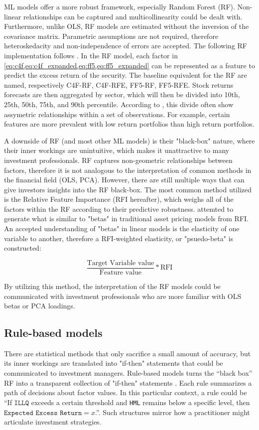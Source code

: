 ML models offer a more robust framework, especially Random Forest (RF). Non-linear relationships can be captured and multicollinearity could be dealt with. Furthermore, unlike OLS, RF models are estimated without the inversion of the covariance matrix. Parametric assumptions are not required, therefore heteroskedacity and non-independence of errors are accepted. The following RF implementation follows . In the RF model, each factor in \cref{eq:c4f,eq:c4f_expanded,eq:ff5,eq:ff5_expanded} can be represented as a feature to predict the excess return of the security. The baseline equivalent for the RF are named, respectively C4F-RF, C4F-RFE, FF5-RF, FF5-RFE. Stock returns forecasts are then aggregated by sector, which will then be divided into 10th, 25th, 50th, 75th, and 90th percentile. According to , this divide often show assymetric relationships within a set of observations. For example, certain features are more prevalent with low return portfolios than high return portfolios.

A downside of RF (and most other ML models) is their "black-box" nature, where their inner workings are unintuitive, which makes it unattractive to many investment professionals. RF captures non-geometric relationships between factors, therefore it is not analogous to the interpretation of common methods in the financial field (OLS, PCA). However, there are still multiple ways that can give investors insights into the RF black-box. The most common method utilized is the Relative Feature Importance (RFI hereafter), which weighs all of the factors within the RF according to their predictive robustness.  attemted to generate what is similar to "betas" in traditional asset pricing models from RFI. An accepted understanding of "betas" in linear models is the elasticity of one variable to another, therefore a RFI-weighted elasticity, or "psuedo-beta" is constructed:

\begin{equation}
    \label{eq:psuedo}
    \frac{\text{Target Variable value}}{\text{{Feature value}}}* \text{RFI}
\end{equation}

By utilizing this method, the interpretation of the RF models could be communicated with investment professionals who are more familiar with OLS betas or PCA loadings.

\subsection{Rule-based models}
There are statistical methods that only sacrifice a small amount of accuracy, but its inner workings are translated into "if-then" statements that could be communicated to investment managers. Rule-based models turns the “black box” RF into a transparent collection of "if-then" statements \cite{benard_2021}. Each rule summarizes a path of decisions about factor values. In this particular context, a rule could be “If $\texttt{ILLQ}$ exceeds a certain threshold and \texttt{HML} remains below a specific level, then $\texttt{Expected Excess Return} = x$.”. Such structures mirror how a practitioner might articulate investment strategies.


